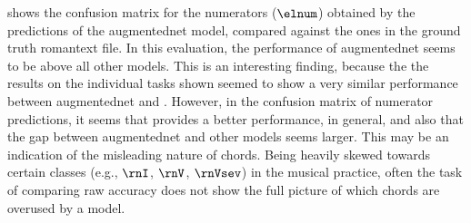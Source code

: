

 shows the
confusion matrix for the numerators ($\elnum$) obtained by
the predictions of the \gls{augmentednet} model, compared
against the ones in the ground truth \gls{romantext} file.
In this evaluation, the performance of \gls{augmentednet}
seems to be above all other models. This is an interesting
finding, because the the results on the individual tasks
shown  seemed to show a very similar
performance between \gls{augmentednet} and
\textcite{micchi2021deep}. However, in the confusion matrix
of numerator predictions, it seems that
\textcite{mcleod2021modular} provides a better performance,
in general, and also that the gap between \gls{augmentednet}
and other models seems larger. This may be an indication of
the misleading nature of chords. Being heavily skewed
towards certain classes (e.g., $\rnI$, $\rnV$, $\rnVsev$) in
the musical practice, often the task of comparing raw
accuracy does not show the full picture of which chords are
overused by a model.


